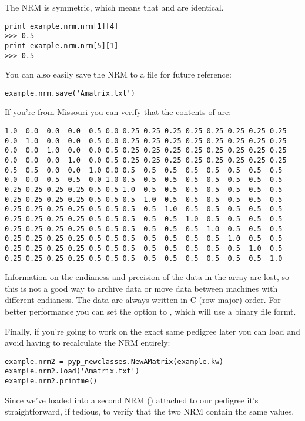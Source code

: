 The NRM is symmetric, which means that  and  are identical.
\begin{verbatim}
print example.nrm.nrm[1][4]
>>> 0.5
print example.nrm.nrm[5][1]
>>> 0.5
\end{verbatim}
You can also easily save the NRM to a file for future reference:
\begin{verbatim}
example.nrm.save('Amatrix.txt')
\end{verbatim}
If you're from Missouri you can verify that the contents of  are:
\begin{verbatim}
1.0  0.0  0.0  0.0  0.5 0.0 0.25 0.25 0.25 0.25 0.25 0.25 0.25 0.25
0.0  1.0  0.0  0.0  0.5 0.0 0.25 0.25 0.25 0.25 0.25 0.25 0.25 0.25
0.0  0.0  1.0  0.0  0.0 0.5 0.25 0.25 0.25 0.25 0.25 0.25 0.25 0.25
0.0  0.0  0.0  1.0  0.0 0.5 0.25 0.25 0.25 0.25 0.25 0.25 0.25 0.25
0.5  0.5  0.0  0.0  1.0 0.0 0.5  0.5  0.5  0.5  0.5  0.5  0.5  0.5
0.0  0.0  0.5  0.5  0.0 1.0 0.5  0.5  0.5  0.5  0.5  0.5  0.5  0.5
0.25 0.25 0.25 0.25 0.5 0.5 1.0  0.5  0.5  0.5  0.5  0.5  0.5  0.5
0.25 0.25 0.25 0.25 0.5 0.5 0.5  1.0  0.5  0.5  0.5  0.5  0.5  0.5
0.25 0.25 0.25 0.25 0.5 0.5 0.5  0.5  1.0  0.5  0.5  0.5  0.5  0.5
0.25 0.25 0.25 0.25 0.5 0.5 0.5  0.5  0.5  1.0  0.5  0.5  0.5  0.5
0.25 0.25 0.25 0.25 0.5 0.5 0.5  0.5  0.5  0.5  1.0  0.5  0.5  0.5
0.25 0.25 0.25 0.25 0.5 0.5 0.5  0.5  0.5  0.5  0.5  1.0  0.5  0.5
0.25 0.25 0.25 0.25 0.5 0.5 0.5  0.5  0.5  0.5  0.5  0.5  1.0  0.5
0.25 0.25 0.25 0.25 0.5 0.5 0.5  0.5  0.5  0.5  0.5  0.5  0.5  1.0
\end{verbatim}
Information on the endianess and precision of the data in the array are lost, so this is not a good way to archive data or move data between machines with different endianess. The data are always written in C (row major) order. For better performance you can set the  option to , which will use a binary file formt.

Finally, if you're going to work on the exact same pedigree later you can load  and avoid having to recalculate the NRM entirely:
\begin{verbatim}
example.nrm2 = pyp_newclasses.NewAMatrix(example.kw)
example.nrm2.load('Amatrix.txt')
example.nrm2.printme()
\end{verbatim}
Since we've loaded  into a second NRM () attached to our pedigree it's straightforward, if tedious, to verify that the two NRM contain the same values.

